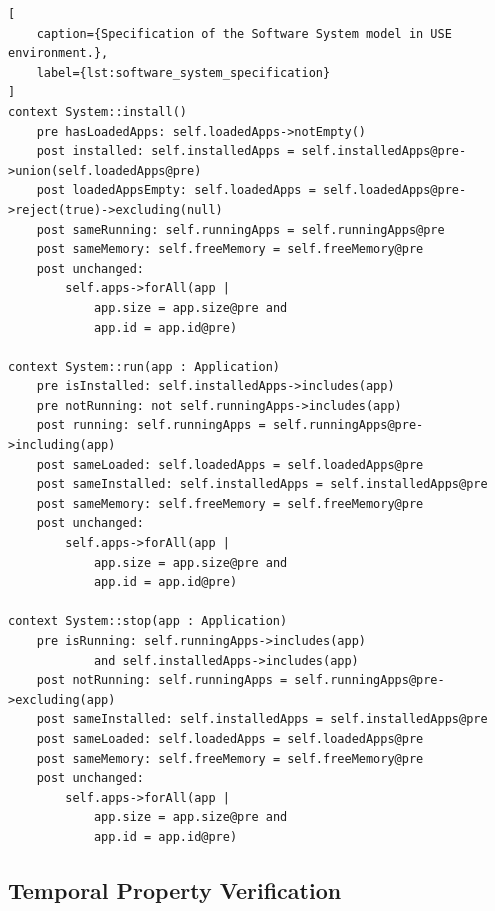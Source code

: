 \begin{lstlisting}[
    caption={Specification of the Software System model in USE environment.},
    label={lst:software_system_specification}
]
context System::install()
    pre hasLoadedApps: self.loadedApps->notEmpty()
    post installed: self.installedApps = self.installedApps@pre->union(self.loadedApps@pre)
    post loadedAppsEmpty: self.loadedApps = self.loadedApps@pre->reject(true)->excluding(null)
    post sameRunning: self.runningApps = self.runningApps@pre
    post sameMemory: self.freeMemory = self.freeMemory@pre
    post unchanged:
        self.apps->forAll(app |
            app.size = app.size@pre and
            app.id = app.id@pre)

context System::run(app : Application)
    pre isInstalled: self.installedApps->includes(app)
    pre notRunning: not self.runningApps->includes(app)
    post running: self.runningApps = self.runningApps@pre->including(app)
    post sameLoaded: self.loadedApps = self.loadedApps@pre
    post sameInstalled: self.installedApps = self.installedApps@pre
    post sameMemory: self.freeMemory = self.freeMemory@pre
    post unchanged:
        self.apps->forAll(app |
            app.size = app.size@pre and
            app.id = app.id@pre)

context System::stop(app : Application)
    pre isRunning: self.runningApps->includes(app)
            and self.installedApps->includes(app)
    post notRunning: self.runningApps = self.runningApps@pre->excluding(app)
    post sameInstalled: self.installedApps = self.installedApps@pre
    post sameLoaded: self.loadedApps = self.loadedApps@pre
    post sameMemory: self.freeMemory = self.freeMemory@pre
    post unchanged:
        self.apps->forAll(app |
            app.size = app.size@pre and
            app.id = app.id@pre)
\end{lstlisting}


\subsection{Temporal Property Verification}


